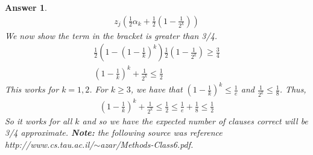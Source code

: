 \documentclass[12pt]{article}
\theoremstyle{colon}
\newtheorem*{answer}{Answer}
\begin{document}
\begin{answer}
  \begin{gather*}
    z_j \left( \frac{1}{2} \alpha_k + \frac{1}{2}(1 - \frac{1}{2^k}) \right)
  \end{gather*}
  We now show the term in the bracket is greater than 3/4.
  \begin{gather*}
    \frac{1}{2} \left(1 - \left( 1 - \frac{1}{k} \right)^k \right) \frac{1}{2}(1 - \frac{1}{2^k}) \geq \frac{3}{4} \\
    \left( 1 - \frac{1}{k} \right)^k + \frac{1}{2^k} \leq \frac{1}{2}
  \end{gather*}
  This works for $k = 1,2$. For $k \geq 3$, we have that $( 1 - \frac{1}{k})^k \leq \frac{1}{e}$ and $\frac{1}{2^k} \leq \frac{1}{8}$. Thus,
  \begin{gather*}
    \left( 1 - \frac{1}{k} \right)^k + \frac{1}{2^k} \leq \frac{1}{2} \leq \frac{1}{e} + \frac{1}{8} \leq \frac{1}{2}
  \end{gather*}
  So it works for all $k$ and so we have the expected number of clauses correct will be 3/4 approximate. \textbf{Note: } the following source was reference http://www.cs.tau.ac.il/$\sim$azar/Methods-Class6.pdf.
\end{answer}

\clearpage
\end{document}
